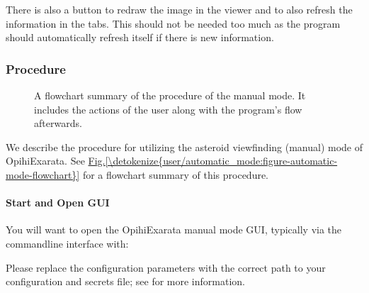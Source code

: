 \documentclass[letterpaper,11pt,english]{sphinxmanual}
\begin{document}
\sphinxAtStartPar
There is also a  button to redraw the image in the viewer and
to also refresh the information in the tabs. This should not be needed too much
as the program should automatically refresh itself if there is new information.


\subsubsection{Procedure}
\label{\detokenize{user/manual_mode:procedure}}
\begin{figure}[htbp]
\centering
\capstart

\noindent{}
\caption{A flowchart summary of the procedure of the manual mode. It includes
the actions of the user along with the program’s flow afterwards.}\label{\detokenize{user/manual_mode:id3}}\label{\detokenize{user/manual_mode:figure-manual-mode-flowchart}}\end{figure}

\sphinxAtStartPar
We describe the procedure for utilizing the asteroid view\sphinxhyphen{}finding (manual)
mode of OpihiExarata. See \hyperref[\detokenize{user/automatic_mode:figure-automatic-mode-flowchart}]{Fig.\@ \ref{\detokenize{user/automatic_mode:figure-automatic-mode-flowchart}}} for a
flowchart summary of this procedure.


\paragraph{Start and Open GUI}
\label{\detokenize{user/manual_mode:start-and-open-gui}}
\sphinxAtStartPar
You will want to open the OpihiExarata manual mode GUI, typically via the
command\sphinxhyphen{}line interface with:

\begin{sphinxVerbatim}[commandchars=\\\{\}]
   
\end{sphinxVerbatim}

\sphinxAtStartPar
Please replace the configuration parameters with the correct path to your
configuration and secrets file; see {\hyperref[\detokenize{user/configuration:user-configuration}]{}} for more
information.
\end{document}
